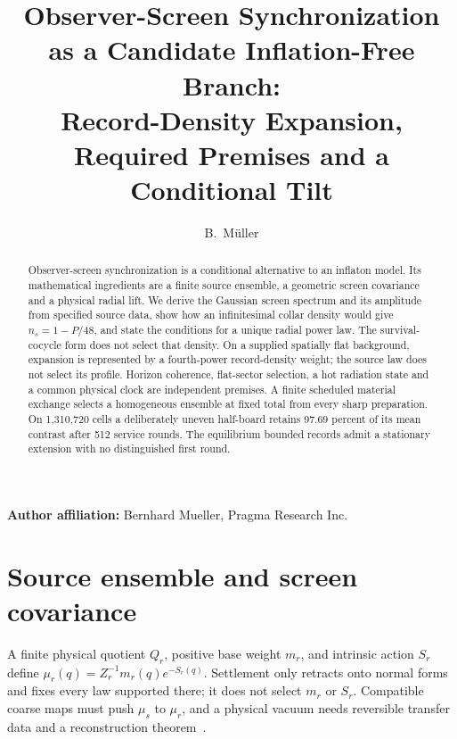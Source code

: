 \documentclass[11pt]{article}
\title{Observer-Screen Synchronization as a Candidate Inflation-Free Branch:\\
Record-Density Expansion, Required Premises and a Conditional Tilt}
\author{B.\ M\"uller}
\date{\OPHPaperReleaseDate}
\theoremstyle{remark}
\theoremstyle{plain}
\begin{document}
\maketitle
\OPHPaperReleaseBanner

\begin{center}
\small\textbf{Author affiliation:} Bernhard Mueller, Pragma Research Inc.
\end{center}

\begin{abstract}
Observer-screen synchronization is a conditional alternative to an inflaton
model. Its mathematical ingredients are a finite source ensemble, a
geometric screen covariance and a physical radial lift. We derive the
Gaussian screen spectrum and its amplitude from specified source data,
show how an infinitesimal collar density would give
\(n_s=1-P/48\), and state the conditions for a unique radial power law.
The survival-cocycle form does not select that density. On a supplied spatially flat
background, expansion is represented by a fourth-power record-density
weight; the source law does not select its profile. Horizon coherence,
flat-sector selection, a hot radiation state and a common physical clock
are independent premises. A finite scheduled material exchange selects a homogeneous ensemble at
fixed total from every sharp preparation. On 1,310,720 cells a deliberately
uneven half-board retains 97.69 percent of its mean contrast after 512
service rounds. The equilibrium bounded records admit a stationary extension
with no distinguished first round.

\end{abstract}

\section{Source ensemble and screen covariance}
\label{sec:screen-spectrum-theorems}
A finite physical quotient \(Q_r\), positive base weight \(m_r\), and
intrinsic action \(S_r\) define
\(\mu_r(q)=Z_r^{-1}m_r(q)e^{-S_r(q)}\). Settlement only retracts onto
normal forms and fixes every law supported there; it does not select
\(m_r\) or \(S_r\). Compatible coarse maps must push \(\mu_s\) to
\(\mu_r\), and a physical vacuum needs reversible transfer data and a
reconstruction theorem~\cite{ophvacuum}.


\end{document}
